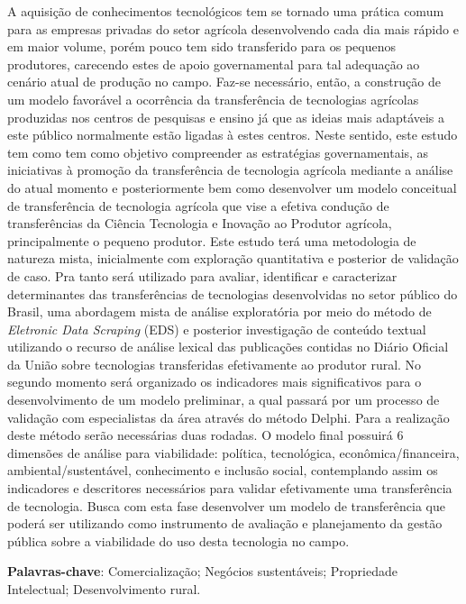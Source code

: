 \setlength{\absparsep}{18pt} %
\begin{resumo}




A aquisição de conhecimentos tecnológicos tem se tornado uma prática comum para as empresas privadas do setor agrícola desenvolvendo cada dia mais rápido e em maior volume, porém pouco tem sido transferido para os pequenos produtores, carecendo estes de apoio governamental para tal adequação ao cenário atual de produção no campo. Faz-se necessário, então, a construção de um modelo favorável a ocorrência da transferência de tecnologias agrícolas produzidas nos centros de pesquisas e ensino já que as ideias mais adaptáveis a este público normalmente estão ligadas à estes centros. Neste sentido, este estudo tem como tem como objetivo compreender as estratégias governamentais, as iniciativas à promoção da transferência de tecnologia agrícola mediante a análise do atual momento e posteriormente bem como desenvolver um modelo conceitual de transferência de tecnologia agrícola que vise a efetiva condução de transferências da Ciência Tecnologia e Inovação ao Produtor agrícola, principalmente o pequeno produtor. Este estudo terá uma metodologia de natureza mista, inicialmente com exploração quantitativa e posterior de validação de caso. Pra tanto será utilizado para avaliar, identificar e caracterizar determinantes das transferências de tecnologias desenvolvidas no setor público do Brasil, uma abordagem mista de análise exploratória  por meio do método de \textit{Eletronic Data Scraping} (EDS) e posterior  investigação de conteúdo textual utilizando o recurso de análise lexical das publicações contidas no Diário Oficial da União sobre tecnologias transferidas efetivamente ao produtor rural. No segundo momento será organizado os indicadores mais significativos para o desenvolvimento de um modelo preliminar, a qual passará por um processo de validação com especialistas da área através do método Delphi. Para a realização deste método serão necessárias duas rodadas. O modelo final possuirá 6 dimensões de análise para viabilidade: política, tecnológica, econômica/financeira, ambiental/sustentável, conhecimento e inclusão social, contemplando assim os indicadores e descritores necessários para validar efetivamente uma transferência de tecnologia. Busca com esta fase desenvolver um modelo de transferência que poderá ser utilizando como instrumento de avaliação e planejamento da gestão pública sobre a viabilidade do uso desta tecnologia no campo.

\textbf{Palavras-chave}: Comercialização; Negócios sustentáveis; Propriedade Intelectual; Desenvolvimento rural.
\end{resumo}